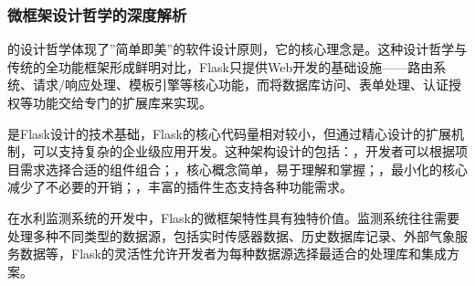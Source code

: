 \hypertarget{ux5faeux6846ux67b6ux8bbeux8ba1ux54f2ux5b66ux7684ux6df1ux5ea6ux89e3ux6790}{%
\subsubsection{微框架设计哲学的深度解析}\label{ux5faeux6846ux67b6ux8bbeux8ba1ux54f2ux5b66ux7684ux6df1ux5ea6ux89e3ux6790}}

的设计哲学体现了''简单即美''的软件设计原则，它的核心理念是。这种设计哲学与传统的全功能框架形成鲜明对比，Flask只提供Web开发的基础设施------路由系统、请求/响应处理、模板引擎等核心功能，而将数据库访问、表单处理、认证授权等功能交给专门的扩展库来实现。

是Flask设计的技术基础，Flask的核心代码量相对较小，但通过精心设计的扩展机制，可以支持复杂的企业级应用开发。这种架构设计的包括：，开发者可以根据项目需求选择合适的组件组合；，核心概念简单，易于理解和掌握；，最小化的核心减少了不必要的开销；，丰富的插件生态支持各种功能需求。

在水利监测系统的开发中，Flask的微框架特性具有独特价值。监测系统往往需要处理多种不同类型的数据源，包括实时传感器数据、历史数据库记录、外部气象服务数据等，Flask的灵活性允许开发者为每种数据源选择最适合的处理库和集成方案。

